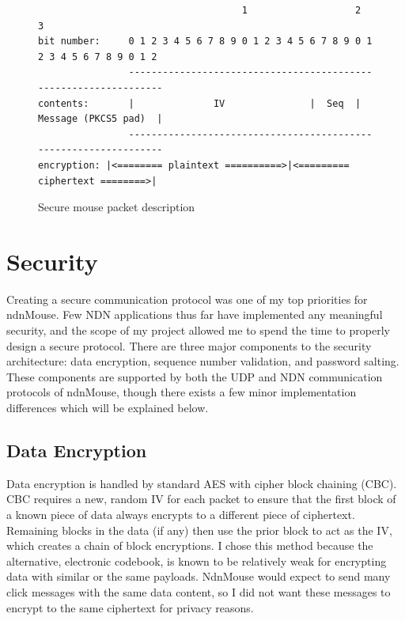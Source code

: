 \documentclass{sig-alternate}
\renewcommand\_{\textunderscore\allowbreak}  %
\begin{document}
\begin{figure}
	\hypertarget{fig:mousePacketDescription}{}
\begin{lstlisting}
                                    1                   2                   3
bit number:     0 1 2 3 4 5 6 7 8 9 0 1 2 3 4 5 6 7 8 9 0 1 2 3 4 5 6 7 8 9 0 1 2
                -----------------------------------------------------------------
contents:       |              IV               |  Seq  |  Message (PKCS5 pad)  |
                -----------------------------------------------------------------
encryption:	|<======== plaintext ==========>|<========= ciphertext ========>|
\end{lstlisting}
\caption{Secure mouse packet description}
\end{figure}

\section{Security}
Creating a secure communication protocol was one of my top priorities for ndnMouse. Few NDN applications thus far have implemented any meaningful security, and the scope of my project allowed me to spend the time to properly design a secure protocol. There are three major components to the security architecture: data encryption, sequence number validation, and password salting. These components are supported by both the UDP and NDN communication protocols of ndnMouse, though there exists a few minor implementation differences which will be explained below.

\subsection{Data Encryption}
Data encryption is handled by standard AES with cipher block chaining (CBC). CBC requires a new, random IV for each packet to ensure that the first block of a known piece of data always encrypts to a different piece of ciphertext. Remaining blocks in the data (if any) then use the prior block to act as the IV, which creates a chain of block encryptions. I chose this method because the alternative, electronic codebook, is known to be relatively weak for encrypting data with similar or the same payloads. NdnMouse would expect to send many click messages with the same data content, so I did not want these messages to encrypt to the same ciphertext for privacy reasons. 
\end{document}
